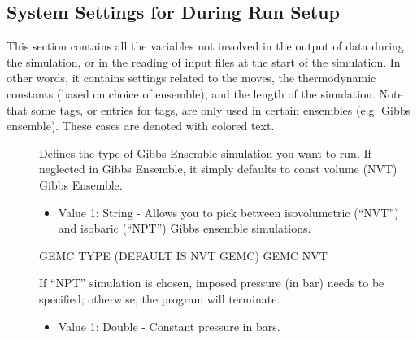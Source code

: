 \documentclass[letterpaper,10pt,english]{sphinxmanual}
\begin{document}
\subsection{System Settings for During Run Setup}
\label{\detokenize{input_file:system-settings-for-during-run-setup}}
This section contains all the variables not involved in the output of data during the simulation, or in the reading of input files at the start of the simulation. In other words, it contains settings related to the moves, the thermodynamic constants (based on choice of ensemble), and the length of the simulation.
Note that some tags, or entries for tags, are only used in certain ensembles (e.g. Gibbs ensemble). These cases are denoted with colored text.
\begin{description}
\item[{}] \leavevmode
{} Defines the type of Gibbs Ensemble simulation you want to run. If neglected in Gibbs Ensemble, it simply defaults to const volume (NVT) Gibbs Ensemble.
\begin{itemize}
\item {} 
Value 1: String - Allows you to pick between isovolumetric (“NVT”) and isobaric (“NPT”) Gibbs ensemble simulations.

\end{itemize}

%
\begin{sphinxVerbatim}[commandchars=\\\{\}]
\PYGZsh{}\PYGZsh{}\PYGZsh{}\PYGZsh{}\PYGZsh{}\PYGZsh{}\PYGZsh{}\PYGZsh{}\PYGZsh{}\PYGZsh{}\PYGZsh{}\PYGZsh{}\PYGZsh{}\PYGZsh{}\PYGZsh{}\PYGZsh{}\PYGZsh{}\PYGZsh{}\PYGZsh{}\PYGZsh{}\PYGZsh{}\PYGZsh{}\PYGZsh{}\PYGZsh{}\PYGZsh{}\PYGZsh{}\PYGZsh{}\PYGZsh{}\PYGZsh{}\PYGZsh{}\PYGZsh{}\PYGZsh{}\PYGZsh{}
\PYGZsh{} GEMC TYPE (DEFAULT IS NVT GEMC)
\PYGZsh{}\PYGZsh{}\PYGZsh{}\PYGZsh{}\PYGZsh{}\PYGZsh{}\PYGZsh{}\PYGZsh{}\PYGZsh{}\PYGZsh{}\PYGZsh{}\PYGZsh{}\PYGZsh{}\PYGZsh{}\PYGZsh{}\PYGZsh{}\PYGZsh{}\PYGZsh{}\PYGZsh{}\PYGZsh{}\PYGZsh{}\PYGZsh{}\PYGZsh{}\PYGZsh{}\PYGZsh{}\PYGZsh{}\PYGZsh{}\PYGZsh{}\PYGZsh{}\PYGZsh{}\PYGZsh{}\PYGZsh{}\PYGZsh{}
GEMC NVT
\end{sphinxVerbatim}

\item[{}] \leavevmode
If “NPT” simulation is chosen, imposed pressure (in bar) needs to be specified; otherwise, the program will terminate.
\begin{itemize}
\item {} 
Value 1: Double - Constant pressure in bars.


\end{itemize}
\end{description}
\end{document}
